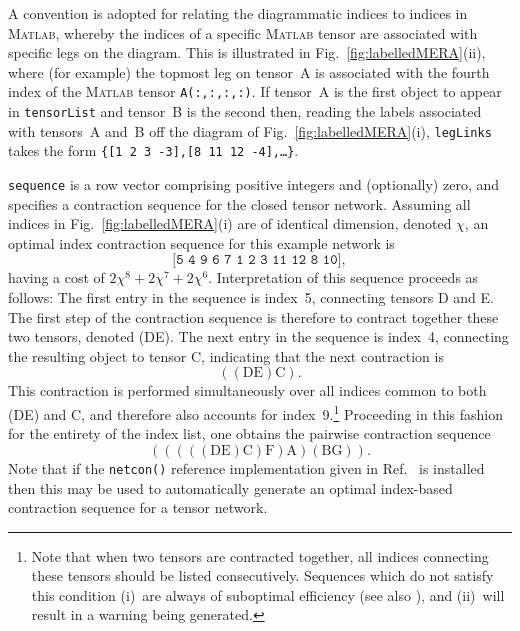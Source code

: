 \documentclass[aps,prb,reprint,superscriptaddress,amsmath,amsfonts]{revtex4-1}
\theoremstyle{definition}
\newcommand{\mrm}[1]{\mathrm{#1}}
\newcommand{\fref}[1]{Fig.~\ref{#1}}
\newcommand{\psref}[1]{\protect{Sec.~\ref{#1}}}
\newcommand{\rcite}[1]{Ref.~\onlinecite{#1}}
\newcommand{\MATLAB}{\textsc{Matlab}}
\newcommand{\ttt}[1]{\texttt{#1}}
\newcommand{\z}{}
\begin{document}
A convention is adopted for relating the diagrammatic indices to indices in \MATLAB{}, whereby the indices of a specific \MATLAB{} tensor are associated with specific legs on the diagram. This is illustrated in \fref{fig:labelledMERA}(ii), where (for example) the topmost leg on tensor~A is associated with the fourth index of the \MATLAB{} tensor \ttt{A(:,:,:,:)}. If tensor~A is the first object to appear in \ttt{tensorList} and tensor~B is the second then, reading the labels associated with tensors~A and~B off the diagram of \fref{fig:labelledMERA}(i), \ttt{legLinks} takes the form \ttt{\{[1 2 3 -3],[8 11 12 -4],\ldots\}}.

\ttt{sequence} is a row vector comprising positive integers and (optionally) zero, and specifies a contraction sequence for the closed tensor network. Assuming all indices in \fref{fig:labelledMERA}(i) are of identical dimension, denoted $\chi$, an optimal index contraction sequence for this example network is 
\begin{equation*}
\ttt{[5 4 9 6 7 1 2 3 11 12 8 10]},%
\end{equation*}
having a cost of $2\chi^8+2\chi^7+2\chi^6$. Interpretation of this sequence proceeds as follows: The first entry in the sequence is index~5, connecting tensors D and E. The first step of the contraction sequence is therefore to contract together these two tensors, denoted (D\z{}E). The next entry in the sequence is index~4, connecting the resulting object to tensor C, indicating that the next contraction is  
\begin{equation*}
\mrm{((D\z{}E)\z{}C)}. 
\end{equation*}
This contraction is performed simultaneously over all indices common to both (D\z{}E) and C, and therefore also accounts for index~9.\footnote{Note that when two tensors are contracted together, all indices connecting these tensors should be listed consecutively. Sequences which do not satisfy this condition (i)~are always of suboptimal efficiency (see also \psref{sec:suboptimal}), and (ii)~will result in a warning being generated.}
Proceeding in this fashion for the entirety of the index list, one obtains the pairwise contraction sequence 
\begin{equation*}
\mrm{(((((D\z{}E)\z{}C)\z{}F)\z{}A)\z{}(B\z{}G))}. 
\end{equation*}
Note that if the \ttt{netcon()} reference implementation given in \rcite{pfeifer2013a} is installed then this may be used to automatically 
generate an optimal index-based contraction sequence for a tensor network. %
\end{document}

